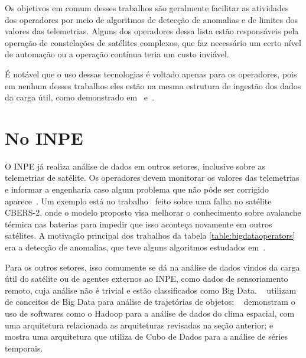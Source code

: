 Os objetivos em comum desses trabalhos são geralmente facilitar as atividades dos operadores por meio de algoritmos de detecção de anomalias e de limites dos valores das telemetrias. Alguns dos operadores dessa lista estão responsáveis pela operação de constelações de satélites complexos, que faz necessário um certo nível de automação ou a operação contínua teria um custo inviável.

É notável que o uso dessas tecnologias é voltado apenas para os operadores, pois em nenhum desses trabalhos eles estão na mesma estrutura de ingestão dos dados da carga útil, como demonstrado em~\cite{mateikUsingBigData2017} e~\cite{adamskiDataAnalyticsLarge2016}.


\section{No INPE}

O INPE já realiza análise de dados em outros setores, inclusive sobre as telemetrias de satélite.
Os operadores devem monitorar os valores das telemetrias e informar a engenharia caso algum problema que não pôde ser corrigido aparece~\cite{TominagaFerrAmbr:2017:CoSaTe}.
Um exemplo está no trabalho~\cite{Magalhães:2012:EsAvTé} feito sobre uma falha no satélite CBERS-2, onde o modelo proposto visa melhorar o conhecimento sobre avalanche térmica nas baterias para impedir que isso aconteça novamente em outros satélites.
A motivação principal dos trabalhos da tabela \ref{table:bigdataoperators} era a detecção de anomalias, que teve alguns algoritmos estudados em~\cite{AzevedoAmbrViei::EsSoTé}.

Para os outros setores, isso comumente se dá na análise de dados vindos da carga útil do satélite ou de agentes externos ao INPE, como dados de sensoriamento remoto, cuja análise não é trivial e estão classificados como Big Data.
~\cite{monteiroFRAMEWORKTRAJECTORYDATA2017} utilizam de conceitos de Big Data para análise de trajetórias de objetos; ~\cite{ramosDistributedSystemsPerformance2016} demonstram o uso de softwares como o Hadoop para a análise de dados do clima espacial, com uma arquitetura relacionada as arquiteturas revisadas na seção anterior; e ~\cite{SimõesCamaQuei:2018:DaAnMa} mostra uma arquitetura que utiliza de Cubo de Dados para a análise de séries temporais.

